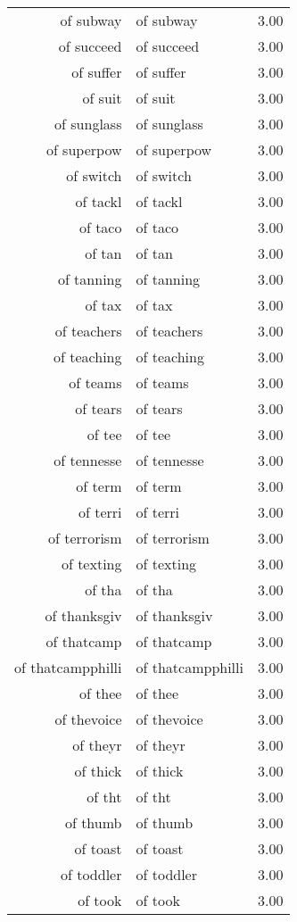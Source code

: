 \begin{table}[ht]
\begin{tabular}{rlr}
  of subway & of subway & 3.00 \\ 
  of succeed & of succeed & 3.00 \\ 
  of suffer & of suffer & 3.00 \\ 
  of suit & of suit & 3.00 \\ 
  of sunglass & of sunglass & 3.00 \\ 
  of superpow & of superpow & 3.00 \\ 
  of switch & of switch & 3.00 \\ 
  of tackl & of tackl & 3.00 \\ 
  of taco & of taco & 3.00 \\ 
  of tan & of tan & 3.00 \\ 
  of tanning & of tanning & 3.00 \\ 
  of tax & of tax & 3.00 \\ 
  of teachers & of teachers & 3.00 \\ 
  of teaching & of teaching & 3.00 \\ 
  of teams & of teams & 3.00 \\ 
  of tears & of tears & 3.00 \\ 
  of tee & of tee & 3.00 \\ 
  of tennesse & of tennesse & 3.00 \\ 
  of term & of term & 3.00 \\ 
  of terri & of terri & 3.00 \\ 
  of terrorism & of terrorism & 3.00 \\ 
  of texting & of texting & 3.00 \\ 
  of tha & of tha & 3.00 \\ 
  of thanksgiv & of thanksgiv & 3.00 \\ 
  of thatcamp & of thatcamp & 3.00 \\ 
  of thatcampphilli & of thatcampphilli & 3.00 \\ 
  of thee & of thee & 3.00 \\ 
  of thevoice & of thevoice & 3.00 \\ 
  of theyr & of theyr & 3.00 \\ 
  of thick & of thick & 3.00 \\ 
  of tht & of tht & 3.00 \\ 
  of thumb & of thumb & 3.00 \\ 
  of toast & of toast & 3.00 \\ 
  of toddler & of toddler & 3.00 \\ 
  of took & of took & 3.00 \\ 

\end{tabular}
\end{table}
